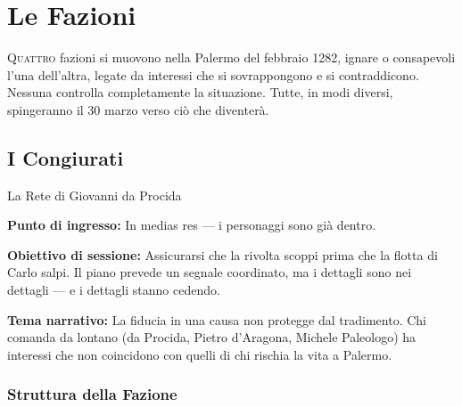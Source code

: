 
\chapter{Le Fazioni}

\lettrine[lines=3]{Q}{uattro} fazioni si muovono nella Palermo del febbraio
1282, ignare o consapevoli l'una dell'altra, legate da interessi che si
sovrappongono e si contraddicono. Nessuna controlla completamente la
situazione. Tutte, in modi diversi, spingeranno il 30 marzo verso
ciò che diventerà.


\secsep

\section{I Congiurati}
\textcolor{oro}{\cinzel\large La Rete di Giovanni da Procida}

\filetto

\textbf{Punto di ingresso:} In medias res — i personaggi sono già dentro.

\textbf{Obiettivo di sessione:} Assicurarsi che la rivolta scoppi prima
che la flotta di Carlo salpi. Il piano prevede un segnale coordinato,
ma i dettagli sono nei dettagli — e i dettagli stanno cedendo.

\textbf{Tema narrativo:} La fiducia in una causa non protegge dal
tradimento. Chi comanda da lontano (da Procida, Pietro d'Aragona, Michele
Paleologo) ha interessi che non coincidono con quelli di chi rischia
la vita a Palermo.

\subsection{Struttura della Fazione}

